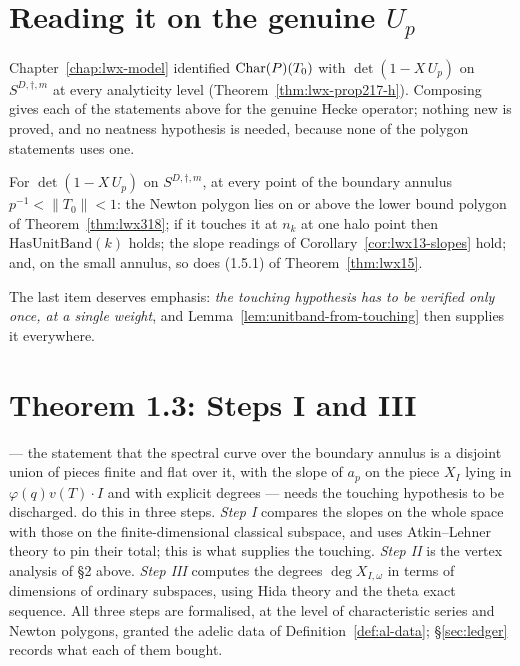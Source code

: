 \section{Reading it on the genuine $U_p$}

Chapter~\ref{chap:lwx-model} identified $\operatorname{Char}(P)(T_0)$ with $\det(1-X\,U_p)$ on
$S^{D,\dagger,m}$ at every analyticity level (Theorem~\ref{thm:lwx-prop217-h}).  Composing gives
each of the statements above for the genuine Hecke operator; nothing new is proved, and no
neatness hypothesis is needed, because none of the polygon statements uses one.

\begin{theorem}
  \label{thm:lwx-slopes-seam}
  \leanok
  For $\det(1-X\,U_p)$ on $S^{D,\dagger,m}$, at every point of the boundary annulus
  $p^{-1}<\lVert T_0\rVert<1$: the Newton polygon lies on or above the lower bound polygon of
  Theorem~\ref{thm:lwx318}; if it touches it at $n_k$ at one halo point then
  $\mathrm{HasUnitBand}(k)$ holds; the slope readings of Corollary~\ref{cor:lwx13-slopes} hold;
  and, on the small annulus, so does (1.5.1) of Theorem~\ref{thm:lwx15}.
\end{theorem}

The last item deserves emphasis: \emph{the touching hypothesis has to be verified only once, at a
single weight}, and Lemma~\ref{lem:unitband-from-touching} then supplies it everywhere.

\section{Theorem 1.3: Steps I and III}
\label{sec:stepone}

\cite[Theorem 1.3]{LWX} --- the statement that the spectral curve over the boundary annulus is a
disjoint union of pieces finite and flat over it, with the slope of $a_p$ on the piece $X_I$
lying in $\varphi(q)v(T)\cdot I$ and with explicit degrees --- needs the touching hypothesis to be
discharged.  \cite[\S3.23]{LWX} do this in three steps.  \emph{Step I} compares the slopes on the
whole space with those on the finite-dimensional classical subspace, and uses Atkin--Lehner
theory to pin their total; this is what supplies the touching.  \emph{Step II} is the vertex
analysis of \S2 above.  \emph{Step III} computes the degrees $\deg X_{I,\omega}$ in terms of
dimensions of ordinary subspaces, using Hida theory and the theta exact sequence.  All three steps
are formalised, at the level of characteristic series and Newton polygons, granted the adelic
data of Definition~\ref{def:al-data}; \S\ref{sec:ledger} records what each of them bought.

